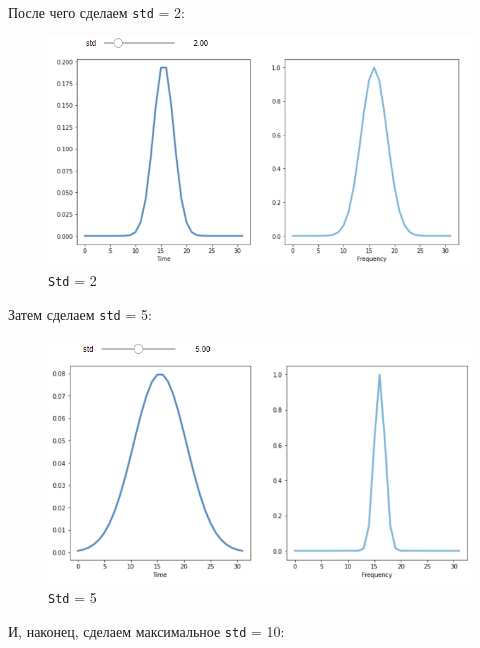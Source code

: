 \documentclass[a4paper]{article}
\begin{document}
            После чего сделаем \texttt{std} = 2:
            
            \begin{figure}[H]
                \centering
                \includegraphics[width=\textwidth]{ex_2_std_2.png}
                \caption{\texttt{Std} = 2}
                \label{fig:ex_2_std_2}
            \end{figure}
            
            Затем сделаем \texttt{std} = 5:
            
            \begin{figure}[H]
                \centering
                \includegraphics[width=\textwidth]{ex_2_std_5.png}
                \caption{\texttt{Std} = 5}
                \label{fig:ex_2_std_5}
            \end{figure}
            
            И, наконец, сделаем максимальное \texttt{std} = 10:
            
\end{document}
